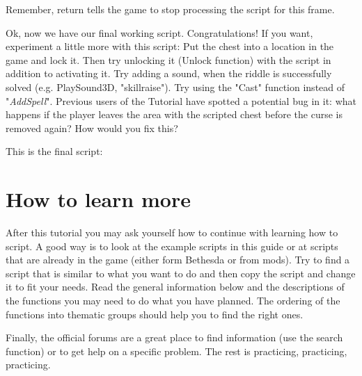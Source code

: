 Remember, return tells the game to stop processing the script for this frame.

Ok, now we have our final working script. Congratulations! If you want, experiment a little more with this script: Put the chest into a location in the game and lock it. Then try unlocking it (Unlock function) with the script in addition to activating it. Try adding a sound, when the riddle is successfully solved (e.g. PlaySound3D, "skillraise"). Try using the "Cast" function instead of "\emph{AddSpell}". Previous users of the Tutorial have spotted a potential bug in it: what happens if the player leaves the area with the scripted chest before the curse is removed again? How would you fix this?

This is the final script:



\hypertarget{how-to-learn-more}{%
\section{How to learn more}\label{how-to-learn-more}}

After this tutorial you may ask yourself how to continue with learning
how to script. A good way is to look at the example scripts in this
guide or at scripts that are already in the game (either form Bethesda
or from mods). Try to find a script that is similar to what you want to
do and then copy the script and change it to fit your needs. Read the
general information below and the descriptions of the functions you may
need to do what you have planned. The ordering of the functions into
thematic groups should help you to find the right ones.

Finally, the official forums are a great place to find information (use
the search function) or to get help on a specific problem. The rest is
practicing, practicing, practicing. %